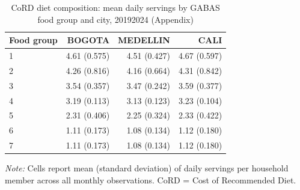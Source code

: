 \begin{table}[htbp]
\centering\small
\caption{CoRD diet composition: mean daily servings by GABAS food group and city, 2019\textendash{}2024 (Appendix)}
\label{tab:cord_servings}
\begin{tabular}{lrrr}
\toprule
Food group & BOGOTA & MEDELLIN & CALI \\
\midrule
1 & 4.61 (0.575) & 4.51 (0.427) & 4.67 (0.597) \\
2 & 4.26 (0.816) & 4.16 (0.664) & 4.31 (0.842) \\
3 & 3.54 (0.357) & 3.47 (0.242) & 3.59 (0.377) \\
4 & 3.19 (0.113) & 3.13 (0.123) & 3.23 (0.104) \\
5 & 2.31 (0.406) & 2.25 (0.324) & 2.33 (0.422) \\
6 & 1.11 (0.173) & 1.08 (0.134) & 1.12 (0.180) \\
7 & 1.11 (0.173) & 1.08 (0.134) & 1.12 (0.180) \\
\bottomrule
\end{tabular}
\begin{minipage}{\linewidth}
\vspace{2pt}\footnotesize
\textit{Note:} Cells report mean (standard deviation) of daily servings per household member across all monthly observations. CoRD = Cost of Recommended Diet.
\end{minipage}
\end{table}
